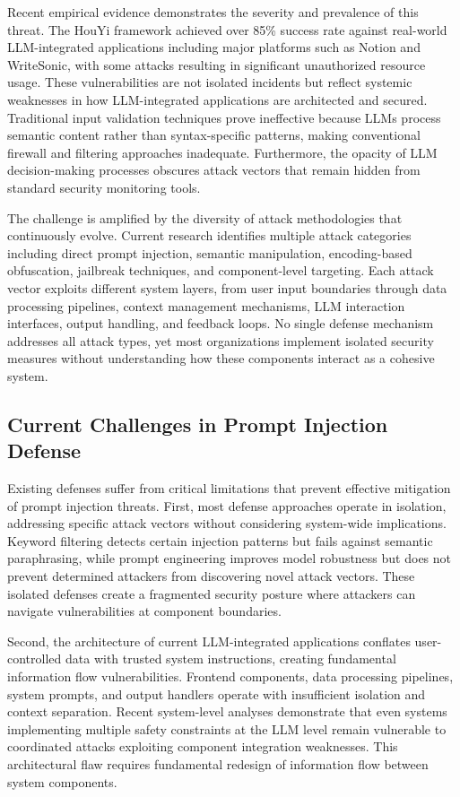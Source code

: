 \documentclass[conference]{IEEEtran}
\begin{document}
Recent empirical evidence demonstrates the severity and prevalence of this threat. The HouYi framework achieved over 85\% success rate against real-world LLM-integrated applications including major platforms such as Notion and WriteSonic, with some attacks resulting in significant unauthorized resource usage. These vulnerabilities are not isolated incidents but reflect systemic weaknesses in how LLM-integrated applications are architected and secured. Traditional input validation techniques prove ineffective because LLMs process semantic content rather than syntax-specific patterns, making conventional firewall and filtering approaches inadequate. Furthermore, the opacity of LLM decision-making processes obscures attack vectors that remain hidden from standard security monitoring tools.

The challenge is amplified by the diversity of attack methodologies that continuously evolve. Current research identifies multiple attack categories including direct prompt injection, semantic manipulation, encoding-based obfuscation, jailbreak techniques, and component-level targeting. Each attack vector exploits different system layers, from user input boundaries through data processing pipelines, context management mechanisms, LLM interaction interfaces, output handling, and feedback loops. No single defense mechanism addresses all attack types, yet most organizations implement isolated security measures without understanding how these components interact as a cohesive system.

\subsection{Current Challenges in Prompt Injection Defense}
Existing defenses suffer from critical limitations that prevent effective mitigation of prompt injection threats. First, most defense approaches operate in isolation, addressing specific attack vectors without considering system-wide implications. Keyword filtering detects certain injection patterns but fails against semantic paraphrasing, while prompt engineering improves model robustness but does not prevent determined attackers from discovering novel attack vectors. These isolated defenses create a fragmented security posture where attackers can navigate vulnerabilities at component boundaries.

Second, the architecture of current LLM-integrated applications conflates user-controlled data with trusted system instructions, creating fundamental information flow vulnerabilities. Frontend components, data processing pipelines, system prompts, and output handlers operate with insufficient isolation and context separation. Recent system-level analyses demonstrate that even systems implementing multiple safety constraints at the LLM level remain vulnerable to coordinated attacks exploiting component integration weaknesses. This architectural flaw requires fundamental redesign of information flow between system components.
\end{document}

